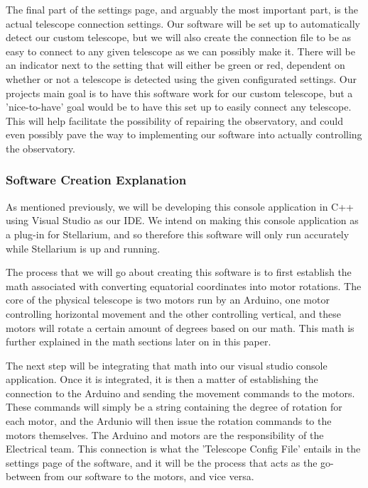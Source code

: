 \documentclass[12pt]{article}
\begin{document}
\newpage

The final part of the settings page, and arguably the most important part, is the actual telescope connection settings. Our software will be set up to automatically detect our custom telescope, but we will also create the connection file to be as easy to connect to any given telescope as we can possibly make it. There will be an indicator next to the setting that will either be green or red, dependent on whether or not a telescope is detected using the given configurated settings. Our projects main goal is to have this software work for our custom telescope, but a 'nice-to-have' goal would be to have this set up to easily connect any telescope. This will help facilitate the possibility of repairing the observatory, and could even possibly pave the way to implementing our software into actually controlling the observatory.


\subsubsection{Software Creation Explanation}

As mentioned previously, we will be developing this console application in C++ using Visual Studio as our IDE. We intend on making this console application as a plug-in for Stellarium, and so therefore this software will only run accurately while Stellarium is up and running.

The process that we will go about creating this software is to first establish the math associated with converting equatorial coordinates into motor rotations. The core of the physical telescope is two motors run by an Arduino, one motor controlling horizontal movement and the other controlling vertical, and these motors will rotate a certain amount of degrees based on our math. This math is further explained in the math sections later on in this paper.

The next step will be integrating that math into our visual studio console application. Once it is integrated, it is then a matter of establishing the connection to the Arduino and sending the movement commands to the motors. These commands will simply be a string containing the degree of rotation for each motor, and the Ardunio will then issue the rotation commands to the motors themselves. The Arduino and motors are the responsibility of the Electrical team. This connection is what the 'Telescope Config File' entails in the settings page of the software, and it will be the process that acts as the go-between from our software to the motors, and vice versa.
\end{document}
